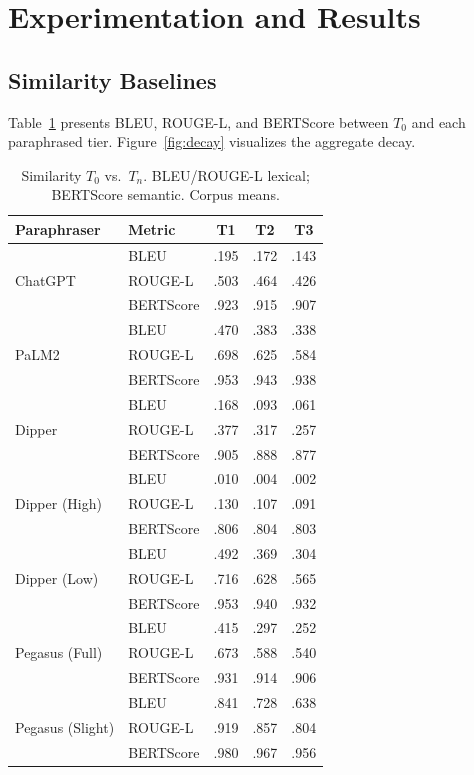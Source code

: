 \section{Experimentation and Results}

\subsection{Similarity Baselines}

Table~\ref{tab:baselines} presents BLEU, ROUGE-L, and BERTScore between $T_0$ and each paraphrased tier. Figure~\ref{fig:decay} visualizes the aggregate decay.

\begin{table}[h]
\centering
\small
\begin{tabular}{llccc}
\toprule
\textbf{Paraphraser} & \textbf{Metric} & \textbf{T1} & \textbf{T2} & \textbf{T3} \\
\midrule
\multirow{3}{*}{ChatGPT} & BLEU & .195 & .172 & .143 \\
 & ROUGE-L & .503 & .464 & .426 \\
 & BERTScore & .923 & .915 & .907 \\
\midrule
\multirow{3}{*}{PaLM2} & BLEU & .470 & .383 & .338 \\
 & ROUGE-L & .698 & .625 & .584 \\
 & BERTScore & .953 & .943 & .938 \\
\midrule
\multirow{3}{*}{Dipper} & BLEU & .168 & .093 & .061 \\
 & ROUGE-L & .377 & .317 & .257 \\
 & BERTScore & .905 & .888 & .877 \\
\midrule
\multirow{3}{*}{Dipper (High)} & BLEU & .010 & .004 & .002 \\
 & ROUGE-L & .130 & .107 & .091 \\
 & BERTScore & .806 & .804 & .803 \\
\midrule
\multirow{3}{*}{Dipper (Low)} & BLEU & .492 & .369 & .304 \\
 & ROUGE-L & .716 & .628 & .565 \\
 & BERTScore & .953 & .940 & .932 \\
\midrule
\multirow{3}{*}{Pegasus (Full)} & BLEU & .415 & .297 & .252 \\
 & ROUGE-L & .673 & .588 & .540 \\
 & BERTScore & .931 & .914 & .906 \\
\midrule
\multirow{3}{*}{Pegasus (Slight)} & BLEU & .841 & .728 & .638 \\
 & ROUGE-L & .919 & .857 & .804 \\
 & BERTScore & .980 & .967 & .956 \\
\bottomrule
\end{tabular}
\caption{Similarity $T_0$ vs.\ $T_n$. BLEU/ROUGE-L lexical; BERTScore semantic. Corpus means.}
\label{tab:baselines}
\end{table}

